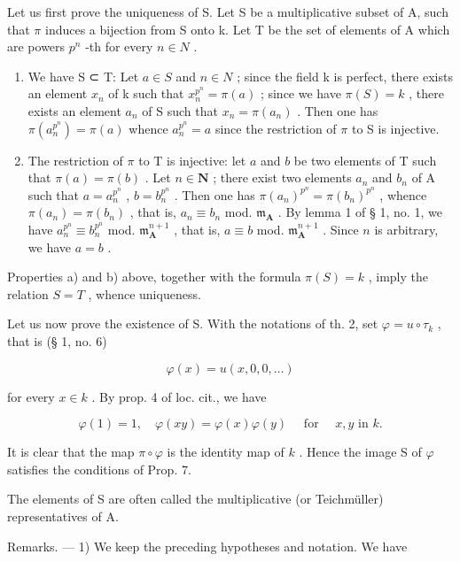 Let us first prove the uniqueness of S. Let S be a multiplicative subset of A, such that \(\pi\) induces a bijection from S onto k. Let T be the set of elements of A which are powers \(p^{n}\) -th for every \(n \in N\) .

\begin{enumerate}
\def\labelenumi{\alph{enumi})}
\item
  We have S ⊂ T: Let \(a \in S\) and \(n \in N\) ; since the field k is perfect, there exists an element \(x_{n}\) of k such that \(x_{n}^{p^{n}} = \pi(a)\) ; since we have \(\pi(S) = k\) , there exists an element \(a_{n}\) of S such that \(x_{n} = \pi(a_{n})\) . Then one has \(\pi(a_{n}^{p^{n}}) = \pi(a)\) whence \(a_{n}^{p^{n}} = a\) since the restriction of \(\pi\) to S is injective.
\item
  The restriction of \(\pi\) to T is injective: let \(a\) and \(b\) be two elements of T such that \(\pi(a) = \pi(b)\) . Let \(n \in \mathbf{N}\) ; there exist two elements \(a_n\) and \(b_n\) of A such that \(a = a_n^{p^n}\) , \(b = b_n^{p^n}\) . Then one has \(\pi(a_n)^{p^n} = \pi(b_n)^{p^n}\) , whence \(\pi(a_n) = \pi(b_n)\) , that is, \(a_n \equiv b_n\) mod. \(\mathfrak{m}_{\mathbf{A}}\) . By lemma 1 of § 1, no. 1, we have \(a_n^{p^n} \equiv b_n^{p^n}\) mod. \(\mathfrak{m}_{\mathbf{A}}^{n+1}\) , that is, \(a \equiv b\) mod. \(\mathfrak{m}_{\mathbf{A}}^{n+1}\) . Since \(n\) is arbitrary, we have \(a = b\) .
\end{enumerate}

Properties a) and b) above, together with the formula \(\pi(S) = k\) , imply the relation \(S = T\) , whence uniqueness.

Let us now prove the existence of S. With the notations of th. 2, set \(\varphi = u \circ \tau_k\) , that is (§ 1, no. 6)

\[
\varphi (x) = u (x, 0, 0, \dots)\tag{2}
\]

for every \(x \in k\) . By prop. 4 of loc. cit., we have

\[
\varphi (1) = 1, \quad \varphi (x y) = \varphi (x) \varphi (y) \quad \text { for } \quad x, y \text {   in   } k.\tag{3}
\]

It is clear that the map \(\pi \circ \varphi\) is the identity map of \(k\) . Hence the image S of \(\varphi\) satisfies the conditions of Prop. 7.

The elements of S are often called the multiplicative (or Teichmüller) representatives of A.

Remarks. --- 1) We keep the preceding hypotheses and notation. We have

